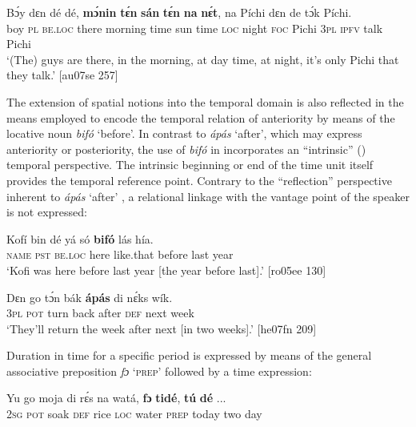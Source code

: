 \ea%
    \label{ex:key:1020}
    \gll Bɔ́y  dɛn  dé    dé,    \textbf{mɔ́nin}  \textbf{tɛ́n}    \textbf{sán}  \textbf{tɛ́n}    \textbf{na}  \textbf{nɛ́t},  
na  Píchi  dɛn  de  tɔ́k  Píchi.\\
boy  \textsc{pl}  \textsc{be.loc}  there  morning  time    sun  time    \textsc{loc}  night
\textsc{foc}  Pichi  \textsc{3pl}  \textsc{ipfv}  talk  Pichi\\

\glt ‘(The) guys are there, in the morning, at day time, at night, 
it’s only Pichi that they talk.’ [au07se 257]
\z

The extension of spatial notions into the temporal domain is also reflected in the means employed to encode the temporal relation of anteriority by means of the locative noun \textit{bifó} ‘before’. In contrast to \textit{ápás} ‘after’, which may express anteriority or posteriority, the use of \textit{bifó} in  incorporates an “intrinsic” (\citealt[221]{BenderBannardo2005}) temporal perspective. The intrinsic beginning or end of the time unit itself provides the temporal reference point. Contrary to the “reflection” perspective inherent to \textit{ápás} ‘after’ , a relational linkage with the vantage point of the speaker is not expressed: 


\ea%
    \label{ex:key:1021}
    \gll Kofí    bin  dé    yá    só    \textbf{bifó}    lás  hía. \\
\textsc{name}  \textsc{pst}  \textsc{be.loc}  here    like.that  before  last  year\\

\glt ‘Kofi was here before last year [the year before last].’ [ro05ee 130]
\z


\ea%
    \label{ex:key:1022}
    \gll Dɛn  go  tɔ́n  bák    \textbf{ápás}  di  nɛ́ks    wík.\\
\textsc{3pl}  \textsc{pot}  turn  back  after  \textsc{def}  next    week\\

\glt ‘They’ll return the week after next [in two weeks].’ [he07fn 209]
\z

Duration in time for a specific period is expressed by means of the general associative preposition \textit{fɔ} ‘\textsc{prep}’ followed by a time expression: 


\ea%
    \label{ex:key:1023}
    \gll Yu  go  moja  di  rɛ́s  na  watá,  \textbf{fɔ}  \textbf{tidé},  \textbf{tú}  \textbf{dé} \op...\cp{}\\
\textsc{2sg}  \textsc{pot}  soak    \textsc{def}  rice  \textsc{loc}  water  \textsc{prep}  today  two  day\\

